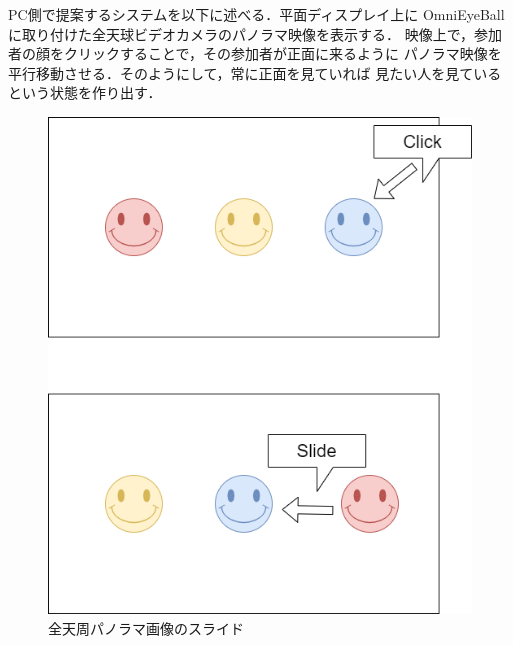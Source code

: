 



PC側で提案するシステムを以下に述べる．平面ディスプレイ上に
OmniEyeBallに取り付けた全天球ビデオカメラのパノラマ映像を表示する．
映像上で，参加者の顔をクリックすることで，その参加者が正面に来るように
パノラマ映像を平行移動させる．そのようにして，常に正面を見ていれば
見たい人を見ているという状態を作り出す．

\begin{figure}[tp]
  \centering
  \includegraphics[scale=0.6]{fig/PCsideSlide.png}
  \caption{全天周パノラマ画像のスライド}
\end{figure}

